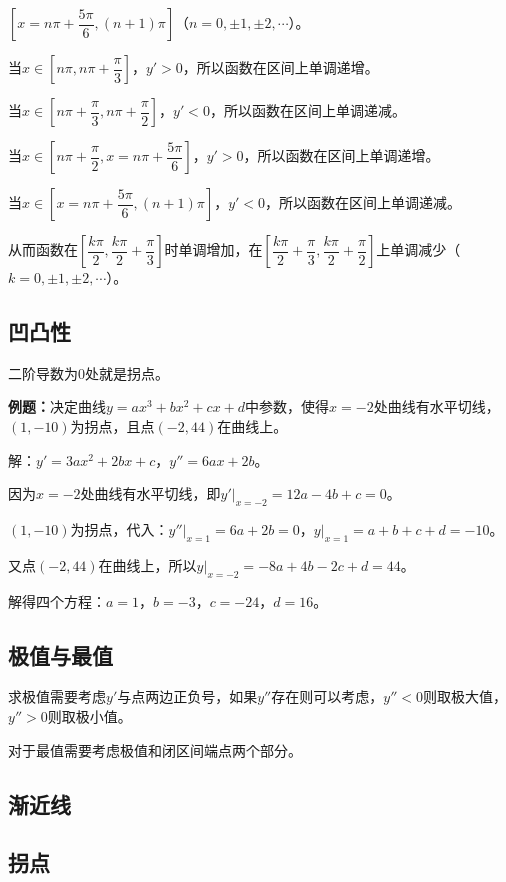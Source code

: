 $\left[x=n\pi+\dfrac{5\pi}{6},(n+1)\pi\right]$（$n=0,\pm 1,\pm2,\cdots$）。

当$x\in\left[n\pi,n\pi+\dfrac{\pi}{3}\right]$，$y'>0$，所以函数在区间上单调递增。

当$x\in\left[n\pi+\dfrac{\pi}{3},n\pi+\dfrac{\pi}{2}\right]$，$y'<0$，所以函数在区间上单调递减。

当$x\in\left[n\pi+\dfrac{\pi}{2},x=n\pi+\dfrac{5\pi}{6}\right]$，$y'>0$，所以函数在区间上单调递增。

当$x\in\left[x=n\pi+\dfrac{5\pi}{6},(n+1)\pi\right]$，$y'<0$，所以函数在区间上单调递减。

从而函数在$\left[\dfrac{k\pi}{2},\dfrac{k\pi}{2}+\dfrac{\pi}{3}\right]$时单调增加，在$\left[\dfrac{k\pi}{2}+\dfrac{\pi}{3},\dfrac{k\pi}{2}+\dfrac{\pi}{2}\right]$上单调减少（$k=0,\pm 1,\pm2,\cdots$）。

\subsection{凹凸性}

二阶导数为0处就是拐点。

\textbf{例题：}决定曲线$y=ax^3+bx^2+cx+d$中参数，使得$x=-2$处曲线有水平切线，$(1,-10)$为拐点，且点$(-2,44)$在曲线上。

解：$y'=3ax^2+2bx+c$，$y''=6ax+2b$。

因为$x=-2$处曲线有水平切线，即$y'\vert_{x=-2}=12a-4b+c=0$。

$(1,-10)$为拐点，代入：$y''\vert_{x=1}=6a+2b=0$，$y\vert_{x=1}=a+b+c+d=-10$。

又点$(-2,44)$在曲线上，所以$y\vert_{x=-2}=-8a+4b-2c+d=44$。

解得四个方程：$a=1$，$b=-3$，$c=-24$，$d=16$。

\subsection{极值与最值}

求极值需要考虑$y'$与点两边正负号，如果$y''$存在则可以考虑，$y''<0$则取极大值，$y''>0$则取极小值。

对于最值需要考虑极值和闭区间端点两个部分。

\subsection{渐近线}

\subsection{拐点}


